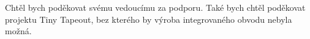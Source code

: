 \documentclass[czech,bachelor,unicode,12pt]{fee-thesis}
\theoremstyle{plain}
\theoremstyle{definition}
\theoremstyle{remark}
\numberwithin{theorem}{chapter}
\begin{document}
 
\frontmatter\frontmatterinit %

\thispagestyle{empty}\cleardoublepage\maketitle %




\printabstractpage %



\begin{acknowledgmentpage}
  Chtěl bych poděkovat svému vedoucímu za podporu. Také bych chtěl poděkovat projektu Tiny Tapeout, bez kterého by výroba integrovaného obvodu nebyla možná.
\end{acknowledgmentpage} 


\clearpage


\tableofcontents %

\clearpage


\end{document}
